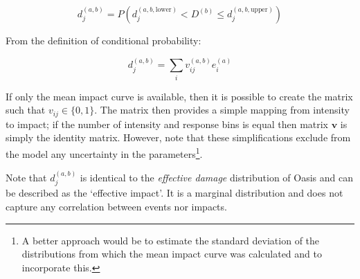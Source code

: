 \documentclass[a4paper,11pt]{extarticle} %
\begin{document}
\begin{equation}
    \label{Eq:impact}
    d^{(a,b)}_j = P \left( d^{(a,b,\text{lower})}_j < D^{(b)} \le d^{(a,b,\text{upper})}_j \right)
\end{equation}

From the definition of conditional probability:

\begin{equation}
    \label{Eq:model}
    d^{(a,b)}_j = \sum_{i} v^{(a,b)}_{ij} e^{(a)}_i
\end{equation}

If only the mean impact curve is available, then it is possible to create the matrix such that $v_{ij} \in \{0, 1\}$. The matrix then provides a simple mapping from intensity to impact; if the number of intensity and response bins is equal then matrix $\mathbf{v}$ is simply the identity matrix. However, note that these simplifications exclude from the model any uncertainty in the parameters\footnote{A better approach would be to estimate the standard deviation of the distributions from which the mean impact curve was calculated and to incorporate this.}.

Note that $d^{(a,b)}_j$ is identical to the {\it effective damage} distribution of Oasis and can be described as the `effective impact'. It is a marginal distribution and does not capture any correlation between events nor impacts.
\end{document}
